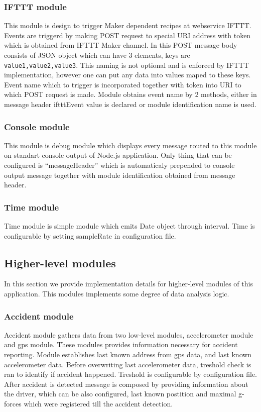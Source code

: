 \subsubsection{IFTTT module} %
\label{ssub:ifttt_module}
This module is design to trigger Maker dependent recipes at webservice IFTTT. Events are triggerd by making POST request to special URI address with token which is obtained from IFTTT Maker channel. In this POST message body consists of JSON object which can have 3 elements, keys are \verb|value1,value2,value3|. This naming is not optional and is enforced by IFTTT implementation, however one can put any data into values maped to these keys. Event name which to trigger is incorporated together with token into URI to which POST request is made. Module obtains event name by 2 methods, either in message header iftttEvent value is declared or module identification name is used.
\subsubsection{Console module} %
\label{ssub:console_module}
This module is debug module which displays every message routed to this module on standart console output of Node.js application. Only thing that can be configured is ``messageHeader'' which is automaticaly prepended to console output message together with module identification obtained from message header.
\subsubsection{Time module} %
\label{ssub:time_module}
Time module is simple module which emits Date object through interval. Time is configurable by setting sampleRate in configuration file.
\subsection{Higher-level modules} %
\label{sub:higher_level_modules}
In this section we provide implementation details for higher-level modules of this application. This modules implements some degree of data analysis logic.
\subsubsection{Accident module} %
\label{ssub:accident_module}
Accident module gathers data from two low-level modules, accelerometer module and gps module. These modules provides information necessary for accident reporting. Module establishes last known address from gps data, and last known accelerometer data. Before overwriting last accelerometer data, treshold check is ran to identify if accident happened. Treshold is configurable by configuration file. After accident is detected message is composed by providing information about the driver, which can be also configured, last known postition and maximal g-forces which were registered till the accident detection.
